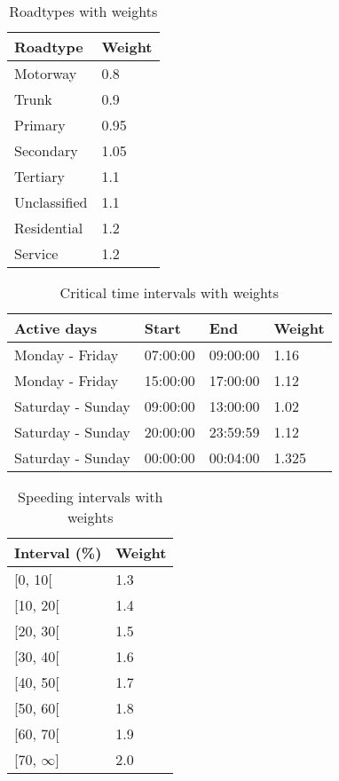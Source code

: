 \begin{table}
    \centering
    \begin{tabular}{ll}
    \textbf{Roadtype} & \textbf{Weight} \\ \hline
    Motorway          & 0.8               \\
    Trunk             & 0.9               \\
    Primary           & 0.95               \\
    Secondary         & 1.05            \\
    Tertiary          & 1.1             \\
    Unclassified      & 1.1             \\
    Residential       & 1.2             \\
    Service           & 1.2             \\ \hline
    \end{tabular}
    \caption{Roadtypes with weights}
    \label{tab:roadtypevalues}
\end{table}

\begin{table}
    \centering
    \begin{tabular}{llll}
    \textbf{Active days} & \textbf{Start} & \textbf{End} & \textbf{Weight} \\ \hline
    Monday - Friday      & 07:00:00       & 09:00:00     & 1.16             \\
    Monday - Friday      & 15:00:00       & 17:00:00     & 1.12            \\
    Saturday - Sunday    & 09:00:00       & 13:00:00     & 1.02           \\
    Saturday - Sunday    & 20:00:00       & 23:59:59     & 1.12            \\
    Saturday - Sunday    & 00:00:00       & 00:04:00     & 1.325             \\ \hline
    \end{tabular}
    \caption{Critical time intervals with weights}
    \label{tab:crittimevalues}
\end{table}

\begin{table}
    \centering
    \begin{tabular}{ll}
    \textbf{Interval (\%)}   & \textbf{Weight} \\ \hline
    {[}0, 10{[}        & 1.3                   \\
    {[}10, 20{[}       & 1.4                   \\
    {[}20, 30{[}       & 1.5                   \\
    {[}30, 40{[}       & 1.6                   \\
    {[}40, 50{[}       & 1.7                   \\
    {[}50, 60{[}       & 1.8                   \\
    {[}60, 70{[}       & 1.9                   \\
    {[}70, $\infty${]} & 2.0                   \\ \hline
    \end{tabular}
    \caption{Speeding intervals with weights}
    \label{tab:speedingvalues}
\end{table}

